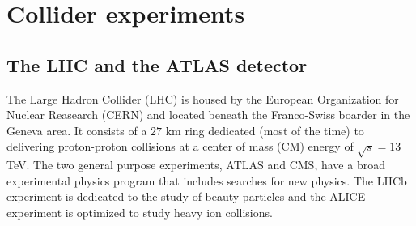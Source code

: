 
\section{Collider experiments}
\label{sec:det}

\subsection{The LHC and the ATLAS detector}
 
The Large Hadron Collider (LHC) is housed by the European Organization for Nuclear Reasearch (CERN) and located beneath the Franco-Swiss boarder in the Geneva area. It consists of a $27$ km ring dedicated (most of the time) to delivering proton-proton collisions at a center of mass (CM) energy of $\sqrt{s}=13$ TeV. The two general purpose experiments, ATLAS and CMS, have a broad experimental physics program that includes searches for new physics. The LHCb experiment is dedicated to the study of beauty particles and the ALICE experiment is optimized to study heavy ion collisions. 

